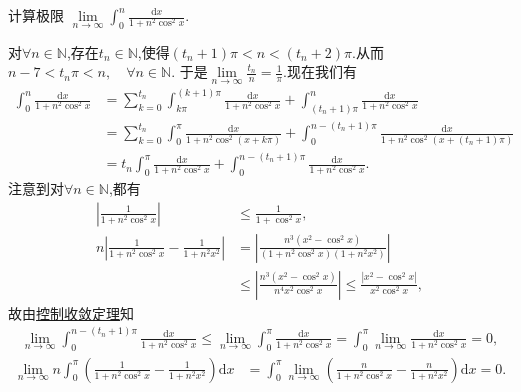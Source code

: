 \documentclass[../../main.tex]{subfiles}%
\begin{document}
\begin{example}
计算极限 $\lim\limits_{n \to \infty} \int_{0}^{n} \frac{\mathrm{d}x}{1 + n^2 \cos^2 x}$.
\end{example}
\begin{solution}

对$\forall n\in \mathbb{N}$,存在$t_n\in \mathbb{N}$,使得$\left( t_n+1 \right) \pi <n<\left( t_n+2 \right) \pi$.从而
$n-7<t_n\pi <n,\quad \forall n\in \mathbb{N}$.
于是$\lim\limits_{n\rightarrow \infty}\frac{t_n}{n}=\frac{1}{\pi}$.现在我们有
\begin{align}
\int_0^n{\frac{\mathrm{d}x}{1+n^2\cos ^2x}}&=\sum\limits_{k=0}^{t_n}{\int_{k\pi}^{\left( k+1 \right) \pi}{\frac{\mathrm{d}x}{1+n^2\cos ^2x}}}+\int_{\left( t_n+1 \right) \pi}^n{\frac{\mathrm{d}x}{1+n^2\cos ^2x}} \nonumber \\
&=\sum\limits_{k=0}^{t_n}{\int_0^{\pi}{\frac{\mathrm{d}x}{1+n^2\cos ^2\left( x+k\pi \right)}}}+\int_0^{n-\left( t_n+1 \right) \pi}{\frac{\mathrm{d}x}{1+n^2\cos ^2\left( x+\left( t_n+1 \right) \pi \right)}} \nonumber \\
&=t_n\int_0^{\pi}{\frac{\mathrm{d}x}{1+n^2\cos ^2x}}+\int_0^{n-\left( t_n+1 \right) \pi}{\frac{\mathrm{d}x}{1+n^2\cos ^2x}}. \label{eq:177.12}
\end{align}
注意到对$\forall n\in \mathbb{N}$,都有
\begin{align*}
\left| \frac{1}{1+n^2\cos ^2x} \right|&\leqslant \frac{1}{1+\cos ^2x}, \\
n\left| \frac{1}{1+n^2\cos ^2x}-\frac{1}{1+n^2x^2} \right|&=\left| \frac{n^3\left( x^2-\cos ^2x \right)}{\left( 1+n^2\cos ^2x \right) \left( 1+n^2x^2 \right)} \right| \\
&\leqslant \left| \frac{n^3\left( x^2-\cos ^2x \right)}{n^4x^2\cos ^2x} \right|\leqslant \frac{\left| x^2-\cos ^2x \right|}{x^2\cos ^2x},
\end{align*}
故由\hyperref[Real-Analysis-theorem:控制收敛定理]{控制收敛定理}知
\begin{align}
\lim\limits_{n\rightarrow \infty}\int_0^{n-\left( t_n+1 \right) \pi}{\frac{\mathrm{d}x}{1+n^2\cos ^2x}}\leqslant \lim\limits_{n\rightarrow \infty}\int_0^{\pi}{\frac{\mathrm{d}x}{1+n^2\cos ^2x}}=\int_0^{\pi}{\lim\limits_{n\rightarrow \infty}\frac{\mathrm{d}x}{1+n^2\cos ^2x}}=0, \label{eq:177.13}
\end{align}
\begin{align*}
\lim\limits_{n\rightarrow \infty}n\int_0^{\pi}{\left( \frac{1}{1+n^2\cos ^2x}-\frac{1}{1+n^2x^2} \right) \mathrm{d}x}&=\int_0^{\pi}{\lim\limits_{n\rightarrow \infty}\left( \frac{n}{1+n^2\cos ^2x}-\frac{n}{1+n^2x^2} \right) \mathrm{d}x}=0.

\end{align*}
\end{solution}
\end{document}
